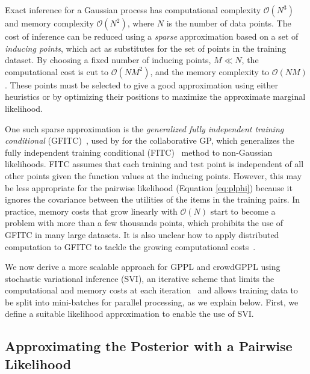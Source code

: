 Exact inference for a Gaussian process has computational complexity $\mathcal{O}(N^3)$ 
and memory complexity $\mathcal{O}(N^2)$, where $N$ is the number of data points.
The cost of inference can be reduced using a \emph{sparse} approximation based on a set of 
\emph{inducing points}, which act as substitutes for the set of points in the training dataset.
By choosing a fixed number of inducing points, $M \ll N$, the computational cost is cut to $\mathcal{O}(NM^2)$,
and the memory complexity to $\mathcal{O}(NM)$.
These points must be selected to give a good approximation
using either heuristics or by optimizing their positions to maximize the approximate
marginal likelihood. 

One such sparse approximation is the \emph{generalized fully independent training conditional} (GFITC)~\citep{NIPS2007_3351}, 
used by \citet{houlsby2012collaborative} for the collaborative GP,
which generalizes the fully independent training conditional 
(FITC)~\cite{snelson2006sparse} method to non-Gaussian likelihoods.
FITC assumes that each training and test point is independent of all other points
given the function values at the inducing points.
However, this may be less appropriate for the pairwise likelihood (Equation \ref{eq:plphi})
because it ignores the covariance between the utilities of the items in the training
pairs.
In practice, memory costs that grow linearly with $\mathcal{O}(N)$
start to become a problem with more than a few thousands points,
which prohibits the use of GFITC in many large datasets. 
It is also unclear how to apply distributed computation to GFITC to tackle the growing
computational costs~\citep{hensman2015scalable}.

We now derive a more scalable approach for GPPL and crowdGPPL using
stochastic variational inference (SVI), an iterative scheme that limits the computational and memory costs at
each iteration~\citep{hoffman2013stochastic}
and allows training data to be split into mini-batches for parallel processing,
as we explain below.
First, we define a suitable likelihood approximation to enable the use of SVI.

\subsection{Approximating the Posterior with a Pairwise Likelihood}

